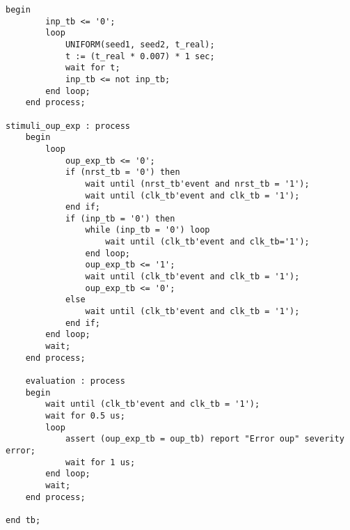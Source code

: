 \begin{minipage}{0.48\textwidth}
	\begin{lstlisting}[firstnumber=last]
	begin
		inp_tb <= '0';
		loop
			UNIFORM(seed1, seed2, t_real);
			t := (t_real * 0.007) * 1 sec;
			wait for t;
			inp_tb <= not inp_tb;
		end loop;
	end process;
	
stimuli_oup_exp : process
	begin
		loop
			oup_exp_tb <= '0';
			if (nrst_tb = '0') then
				wait until (nrst_tb'event and nrst_tb = '1');
				wait until (clk_tb'event and clk_tb = '1');
			end if;
			if (inp_tb = '0') then
				while (inp_tb = '0') loop
					wait until (clk_tb'event and clk_tb='1');
				end loop;
				oup_exp_tb <= '1';
				wait until (clk_tb'event and clk_tb = '1');
				oup_exp_tb <= '0';
			else
				wait until (clk_tb'event and clk_tb = '1');
			end if;
		end loop;
		wait;
	end process;

	evaluation : process
	begin
		wait until (clk_tb'event and clk_tb = '1');
		wait for 0.5 us;
		loop
			assert (oup_exp_tb = oup_tb) report "Error oup" severity error;
			wait for 1 us;
		end loop;
		wait;
	end process;

end tb;








	\end{lstlisting}
\end{minipage}

